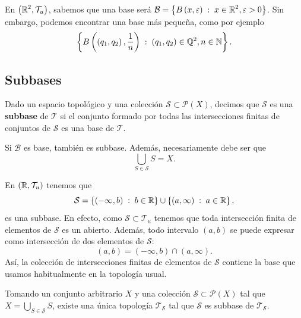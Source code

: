 \begin{eg}
	En $\displaystyle \left(\mathbb{R}^{2}, \mathcal{T}_{u}\right) $, sabemos que una base será $\displaystyle \mathcal{B}= \left\{ B\left(x, \varepsilon \right) \; : \; x \in \mathbb{R}^{2}, \varepsilon > 0\right\}  $. Sin embargo, podemos encontrar una base más pequeña, como por ejemplo  
\[\left\{ B\left(\left(q_{1}, q_{2}\right), \frac{1}{n}\right) \; : \; \left(q_{1}, q_{2}\right)\in \mathbb{Q}^{2}, n \in \mathbb{N}\right\} .\]
\end{eg}
\subsection{Subbases}

\begin{definition}[Subbase]
Dado un espacio topológico y una colección $\displaystyle \mathcal{S}\subset \mathcal{P}\left(X\right) $, decimos que $\displaystyle \mathcal{S} $ es una \textbf{subbase} de $\displaystyle \mathcal{T} $ si el conjunto formado por todas las intersecciones finitas de conjuntos de $\displaystyle \mathcal{S} $ es una base de $\displaystyle \mathcal{T} $.
\end{definition}
\begin{observation}
Si $\displaystyle \mathcal{B} $ es base, también es subbase. Además, necesariamente debe ser que
\[\bigcup_{S \in \mathcal{S}}S = X .\]
\end{observation}
\begin{eg}
En $\displaystyle \left(\mathbb{R}, \mathcal{T}_{u}\right) $ tenemos que 
\[\mathcal{S}= \left\{ \left(-\infty, b\right) \; : \; b \in \mathbb{R}\right\} \cup \left\{ \left(a, \infty \right) \; : \; a \in \mathbb{R}\right\}  ,\]
es una subbase. En efecto, como $\displaystyle \mathcal{S}\subset \mathcal{T}_{u} $ tenemos que toda intersección finita de elementos de $\displaystyle \mathcal{S} $ es un abierto. Además, todo intervalo $\displaystyle \left(a,b\right) $ se puede expresar como intersección de dos elementos de $\displaystyle \mathcal{S} $:
\[\left(a,b\right)=\left(-\infty, b\right)\cap \left(a, \infty\right) .\]
Así, la colección de intersecciones finitas de elementos de $\displaystyle \mathcal{S} $ contiene la base que usamos habitualmente en la topología usual.
\end{eg}
\begin{prop}
Tomando un conjunto arbitrario $\displaystyle X $ y una colección $\displaystyle \mathcal{S}\subset \mathcal{P}\left(X\right) $ tal que $\displaystyle X = \bigcup_{S \in \mathcal{S}}S $, existe una única topología $\displaystyle \mathcal{T}_{\mathcal{S}} $ tal que $\displaystyle \mathcal{S} $ es subbase de $\displaystyle \mathcal{T}_{\mathcal{S}} $. 
\end{prop}
